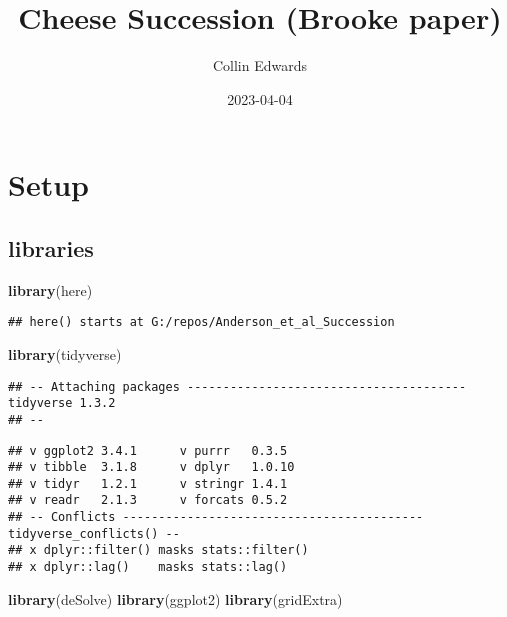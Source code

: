 \documentclass[
]{article}
\title{Cheese Succession (Brooke paper)}
\author{Collin Edwards}
\date{2023-04-04}
\newenvironment{Shaded}{\begin{snugshade}}{\end{snugshade}}
\newcommand{\FunctionTok}[1]{\textcolor[rgb]{0.13,0.29,0.53}{\textbf{#1}}}
\newcommand{\NormalTok}[1]{#1}
\begin{document}
\maketitle

\hypertarget{setup}{%
\section{Setup}\label{setup}}

\hypertarget{libraries}{%
\subsection{libraries}\label{libraries}}

\begin{Shaded}
\begin{Highlighting}[]
\FunctionTok{library}\NormalTok{(here)}
\end{Highlighting}
\end{Shaded}

\begin{verbatim}
## here() starts at G:/repos/Anderson_et_al_Succession
\end{verbatim}

\begin{Shaded}
\begin{Highlighting}[]
\FunctionTok{library}\NormalTok{(tidyverse)}
\end{Highlighting}
\end{Shaded}

\begin{verbatim}
## -- Attaching packages --------------------------------------- tidyverse 1.3.2
## --
\end{verbatim}

\begin{verbatim}
## v ggplot2 3.4.1      v purrr   0.3.5 
## v tibble  3.1.8      v dplyr   1.0.10
## v tidyr   1.2.1      v stringr 1.4.1 
## v readr   2.1.3      v forcats 0.5.2 
## -- Conflicts ------------------------------------------ tidyverse_conflicts() --
## x dplyr::filter() masks stats::filter()
## x dplyr::lag()    masks stats::lag()
\end{verbatim}

\begin{Shaded}
\begin{Highlighting}[]
\FunctionTok{library}\NormalTok{(deSolve)}
\FunctionTok{library}\NormalTok{(ggplot2)}
\FunctionTok{library}\NormalTok{(gridExtra)}
\end{Highlighting}
\end{Shaded}
\end{document}
